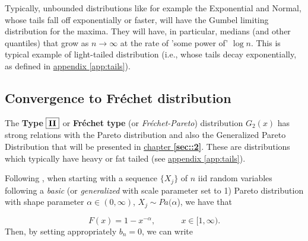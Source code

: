 \documentclass[11pt,a4paper,openany ]{book}
\begin{document}
\vspace{.2cm}
Typically, unbounded distributions like for example the Exponential and Normal, whose tails fall off exponentially
or faster, will have the Gumbel limiting distribution for the maxima. They will have, in particular, medians (and other quantiles) that grow as $n\rightarrow\infty$ at the rate
of 'some power of' $\log n$. This is typical example of light-tailed distribution (i.e., whose tails decay exponentially, as defined in \hyperref[app:tails]{appendix \ref{app:tails}}).

\vspace{-.3cm}
\subsection*{Convergence to Fréchet distribution}

The \textbf{Type}  $\boxed{\textbf{\text{II}}}$ or \textbf{Fréchet type} (or \emph{Fréchet-Pareto}) distribution $G_2(x)$ has strong relations with the Pareto distribution and also the Generalized Pareto Distribution that will be presented in \hyperref[sec::2]{chapter \textbf{\ref{sec::2}}}. These are distributions which typically have heavy or fat tailed (see \hyperref[app:tails]{appendix \ref{app:tails}}).

Following \citet{beirlant_practical_1996}, when starting with a sequence $\{X_j\}$ of $n$ iid random variables following a \textit{basic} (or \textit{generalized} with scale parameter set to 1) Pareto distribution with shape parameter $\alpha\in (0,\infty)$, $X_j\sim Pa(\alpha$), we have that 

\begin{equation}
F(x)=1-x^{-\alpha}, \ \ \ \ \ \ \ \ \ \ \ \ \ \ x\in[1,\infty).
\end{equation}
Then, by setting appropriately $b_n=0$, we can write
\end{document}
